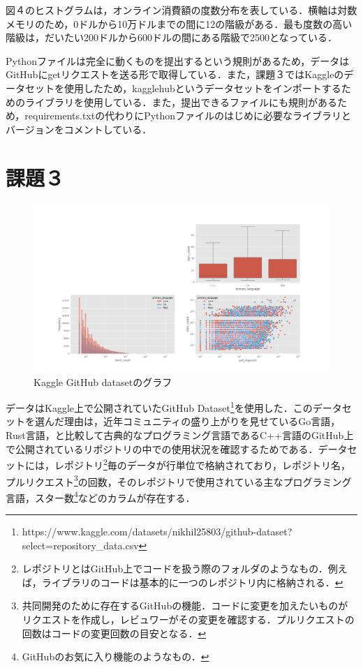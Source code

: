 \documentclass[article]{jlreq}
\begin{document}
図４のヒストグラムは，オンライン消費額の度数分布を表している．横軸は対数メモリのため，0ドルから10万ドルまでの間に12の階級がある．最も度数の高い階級は，だいたい200ドルから600ドルの間にある階級で2500となっている．

Pythonファイルは完全に動くものを提出するという規則があるため，データはGitHubにgetリクエストを送る形で取得している．また，課題３ではKaggleのデータセットを使用したため，kagglehubというデータセットをインポートするためのライブラリを使用している．また，提出できるファイルにも規則があるため，requirements.txtの代わりにPythonファイルのはじめに必要なライブラリとバージョンをコメントしている．

\section{課題３}


\begin{figure}[H]
  \centering
  \includegraphics[width=160mm]{../plots/hw1/github.png}
  \caption{Kaggle GitHub datasetのグラフ}
\end{figure}

データはKaggle上で公開されていたGitHub Dataset\footnote{https://www.kaggle.com/datasets/nikhil25803/github-dataset?select=repository\_data.csv}を使用した．このデータセットを選んだ理由は，近年コミュニティの盛り上がりを見せているGo言語，Rust言語，と比較して古典的なプログラミング言語であるC++言語のGitHub上で公開されているリポジトリの中での使用状況を確認するためである．データセットには，レポジトリ\footnote{レポジトリとはGitHub上でコードを扱う際のフォルダのようなもの．例えば，ライブラリのコードは基本的に一つのレポジトリ内に格納される．}毎のデータが行単位で格納されており，レポジトリ名，プルリクエスト\footnote{共同開発のために存在するGitHubの機能．コードに変更を加えたいものがリクエストを作成し，レビュワーがその変更を確認する．プルリクエストの回数はコードの変更回数の目安となる．}の回数，そのレポジトリで使用されている主なプログラミング言語，スター数\footnote{GitHubのお気に入り機能のようなもの．}などのカラムが存在する．
\end{document}

